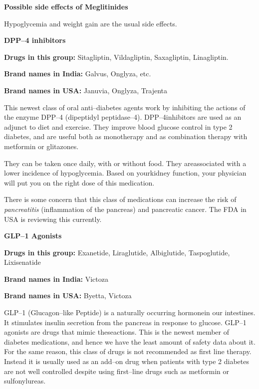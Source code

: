 \noindent\textbf{Possible side effects of Meglitinides}

Hypoglycemia and weight gain are the usual side effects.

\textbf{DPP–4 inhibitors}

\textbf{Drugs in this group:} Sitagliptin, Vildagliptin, Saxagliptin, Lina\-gli\-ptin.

\textbf{Brand names in India:} Galvus, Onglyza, etc.

\textbf{Brand names in USA:} Januvia, Onglyza, Trajenta

\vskip 7pt

This newest class of oral anti–diabetes agents work by inhibi\-ting the actions of the enzyme DPP–4 (dipeptidyl peptidase–4). DPP–4\break inhibitors are used as an adjunct to diet and exercise. They improve blood glucose control in type 2 diabetes, and are useful both as mono\-therapy and as combination therapy with metformin or glitazones.

They can be taken once daily, with or without food. They are\break associated with a lower incidence of hypoglycemia. Based on your\break kidney function, your physician will put you on the right dose of this medication.

There is some concern that this class of medications can increase the risk of \textit{pancreatitis} (inflammation of the pancreas) and pancreatic cancer. The FDA in USA is reviewing this currently.

\vskip 7pt

\textbf{GLP–1 Agonists}

\textbf{Drugs in this group:} Exanetide, Liraglutide, Albiglutide, Taspo\-glutide, Lixisenatide

\textbf{Brand names in India:} Victoza

\textbf{Brand names in USA:} Byetta, Victoza

\vskip 7pt

GLP–1 (Glucagon–like Peptide) is a naturally occurring hormone\break in our intestines. It stimulates insulin secretion from the pancreas in response to glucose. GLP–1 agonists are drugs that mimic these\break actions. This is the newest member of diabetes medications, and hence we have the least amount of safety data about it. For the same reason, this class of drugs is not recommended as first line therapy. Instead it is usually used as an add–on drug when patients with type 2 diabetes are not well controlled despite using first–line drugs such as metformin or sulfonylureas.


